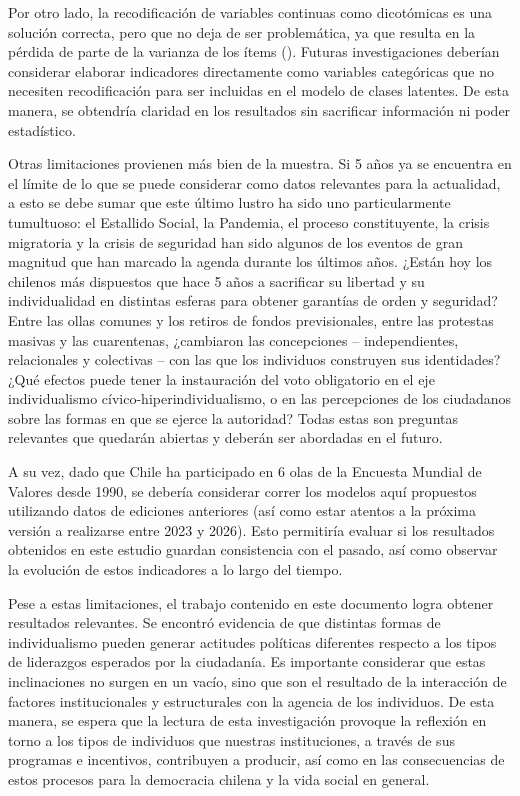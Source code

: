 \documentclass[
  letterpaper,
  DIV=11,
  numbers=noendperiod]{scrartcl}
\begin{document}
Por otro lado, la recodificación de variables continuas como dicotómicas
es una solución correcta, pero que no deja de ser problemática, ya que
resulta en la pérdida de parte de la varianza de los ítems
(). Futuras
investigaciones deberían considerar elaborar indicadores directamente
como variables categóricas que no necesiten recodificación para ser
incluidas en el modelo de clases latentes. De esta manera, se obtendría
claridad en los resultados sin sacrificar información ni poder
estadístico.

Otras limitaciones provienen más bien de la muestra. Si 5 años ya se
encuentra en el límite de lo que se puede considerar como datos
relevantes para la actualidad, a esto se debe sumar que este último
lustro ha sido uno particularmente tumultuoso: el Estallido Social, la
Pandemia, el proceso constituyente, la crisis migratoria y la crisis de
seguridad han sido algunos de los eventos de gran magnitud que han
marcado la agenda durante los últimos años. ¿Están hoy los chilenos más
dispuestos que hace 5 años a sacrificar su libertad y su individualidad
en distintas esferas para obtener garantías de orden y seguridad? Entre
las ollas comunes y los retiros de fondos previsionales, entre las
protestas masivas y las cuarentenas, ¿cambiaron las concepciones --
independientes, relacionales y colectivas -- con las que los individuos
construyen sus identidades? ¿Qué efectos puede tener la instauración del
voto obligatorio en el eje individualismo cívico-hiperindividualismo, o
en las percepciones de los ciudadanos sobre las formas en que se ejerce
la autoridad? Todas estas son preguntas relevantes que quedarán abiertas
y deberán ser abordadas en el futuro.

A su vez, dado que Chile ha participado en 6 olas de la Encuesta Mundial
de Valores desde 1990, se debería considerar correr los modelos aquí
propuestos utilizando datos de ediciones anteriores (así como estar
atentos a la próxima versión a realizarse entre 2023 y 2026). Esto
permitiría evaluar si los resultados obtenidos en este estudio guardan
consistencia con el pasado, así como observar la evolución de estos
indicadores a lo largo del tiempo.

Pese a estas limitaciones, el trabajo contenido en este documento logra
obtener resultados relevantes. Se encontró evidencia de que distintas
formas de individualismo pueden generar actitudes políticas diferentes
respecto a los tipos de liderazgos esperados por la ciudadanía. Es
importante considerar que estas inclinaciones no surgen en un vacío,
sino que son el resultado de la interacción de factores institucionales
y estructurales con la agencia de los individuos. De esta manera, se
espera que la lectura de esta investigación provoque la reflexión en
torno a los tipos de individuos que nuestras instituciones, a través de
sus programas e incentivos, contribuyen a producir, así como en las
consecuencias de estos procesos para la democracia chilena y la vida
social en general.
\end{document}
